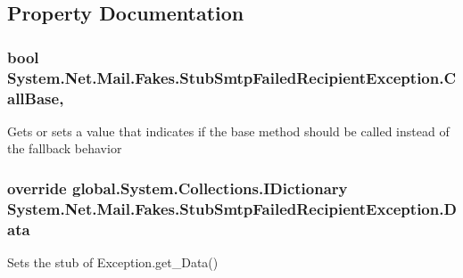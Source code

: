 \subsection{Property Documentation}
\hypertarget{class_system_1_1_net_1_1_mail_1_1_fakes_1_1_stub_smtp_failed_recipient_exception_a950fa1425d1d093b27b65d26f1d3a0c6}{
\subsubsection[{Call\-Base}]{\setlength{\rightskip}{0pt plus 5cm}bool System.\-Net.\-Mail.\-Fakes.\-Stub\-Smtp\-Failed\-Recipient\-Exception.\-Call\-Base\hspace{0.3cm}{\ttfamily [get]}, {\ttfamily [set]}}}\label{class_system_1_1_net_1_1_mail_1_1_fakes_1_1_stub_smtp_failed_recipient_exception_a950fa1425d1d093b27b65d26f1d3a0c6}


Gets or sets a value that indicates if the base method should be called instead of the fallback behavior

\hypertarget{class_system_1_1_net_1_1_mail_1_1_fakes_1_1_stub_smtp_failed_recipient_exception_ac595e2a2657520566571f3f3ffe35429}{
\subsubsection[{Data}]{\setlength{\rightskip}{0pt plus 5cm}override global.\-System.\-Collections.\-I\-Dictionary System.\-Net.\-Mail.\-Fakes.\-Stub\-Smtp\-Failed\-Recipient\-Exception.\-Data\hspace{0.3cm}{\ttfamily [get]}}}\label{class_system_1_1_net_1_1_mail_1_1_fakes_1_1_stub_smtp_failed_recipient_exception_ac595e2a2657520566571f3f3ffe35429}


Sets the stub of Exception.\-get\-\_\-\-Data()

